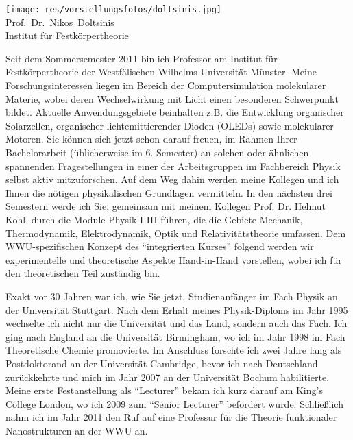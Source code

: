 \begin{multicols}{2}
\begin{center}
\texttt{[image: res/vorstellungsfotos/doltsinis.jpg]}\\
\smallskip
Prof.\ Dr.\ Nikos\ Doltsinis\\
Institut für Festkörpertheorie
\end{center}

Seit dem Sommersemester 2011 bin ich Professor am Institut für Festkörpertheorie der Westfälischen Wilhelms-Universität Münster. Meine Forschungsinteressen liegen im Bereich der Computersimulation molekularer Materie, wobei deren Wechselwirkung mit Licht einen besonderen Schwerpunkt bildet.  Aktuelle Anwendungsgebiete beinhalten z.B. die Entwicklung organischer Solarzellen, organischer lichtemittierender Dioden (OLEDs) sowie molekularer Motoren. Sie können sich jetzt schon darauf freuen, im Rahmen Ihrer Bachelorarbeit (üblicherweise im 6. Semester) an solchen oder ähnlichen spannenden Fragestellungen in einer der Arbeitsgruppen im Fachbereich Physik selbst aktiv mitzuforschen. Auf dem Weg dahin werden meine Kollegen und ich Ihnen die nötigen physikalischen Grundlagen vermitteln. In den nächsten drei Semestern werde ich Sie, gemeinsam mit meinem Kollegen Prof. Dr. Helmut Kohl, durch die Module Physik I-III führen, die die Gebiete Mechanik, Thermodynamik, Elektrodynamik, Optik und Relativitätstheorie umfassen. Dem WWU-spezifischen Konzept des “integrierten Kurses” folgend werden wir experimentelle und theoretische Aspekte Hand-in-Hand vorstellen, wobei ich für den theoretischen Teil zuständig bin. 

Exakt vor 30 Jahren war ich, wie Sie jetzt, Studienanfänger im Fach Physik an der Universität Stuttgart. Nach dem Erhalt meines Physik-Diploms im Jahr 1995 wechselte ich nicht nur die Universität und das Land, sondern auch das Fach. Ich ging nach England an die Universität Birmingham, wo ich im Jahr 1998 im Fach Theoretische Chemie promovierte. Im Anschluss forschte ich zwei Jahre lang als Postdoktorand an der Universität Cambridge, bevor ich nach Deutschland zurückkehrte und mich im Jahr 2007 an der Universität Bochum habilitierte. Meine erste Festanstellung als “Lecturer” bekam ich kurz darauf am King’s College London, wo ich 2009 zum “Senior Lecturer” befördert wurde. Schließlich nahm ich im Jahr 2011 den Ruf auf eine Professur für die Theorie funktionaler Nanostrukturen an der WWU an.  

\end{multicols}

